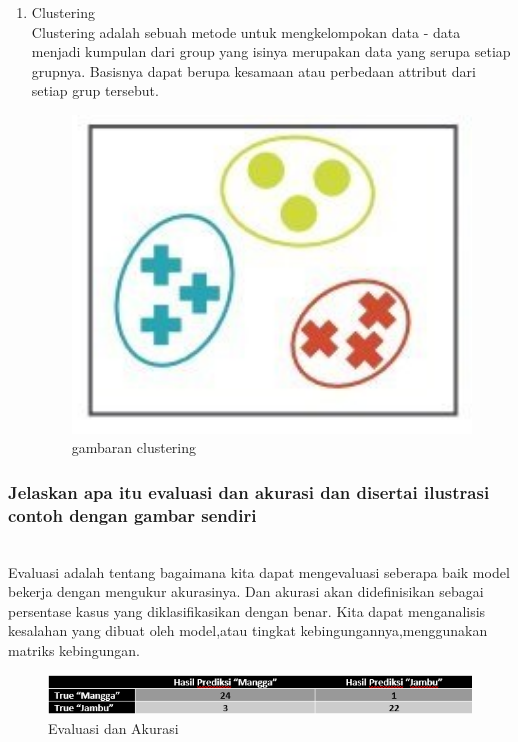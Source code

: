 \begin{enumerate}
\item Clustering 
\hfill\\
Clustering adalah sebuah metode untuk mengkelompokan data - data menjadi kumpulan dari group yang isinya merupakan data yang serupa setiap grupnya. Basisnya dapat berupa kesamaan atau perbedaan attribut dari setiap grup tersebut.
\begin{figure}[H]
    \includegraphics[width=12cm]{figures/1174087/2/cl.png}
    \centering
    \caption{gambaran clustering}
\end{figure}
\end{enumerate}

\subsubsection{Jelaskan apa itu evaluasi dan akurasi dan disertai ilustrasi contoh dengan gambar sendiri}
\hfill\\
Evaluasi adalah tentang bagaimana kita dapat mengevaluasi seberapa baik model bekerja dengan mengukur akurasinya. Dan akurasi akan dideﬁnisikan sebagai persentase kasus yang diklasiﬁkasikan dengan benar. Kita dapat menganalisis kesalahan yang dibuat oleh model,atau tingkat kebingungannya,menggunakan matriks kebingungan. 
\begin{figure}[H]
    \includegraphics[width=12cm]{figures/1174087/2/ea.png}
    \centering
    \caption{Evaluasi dan Akurasi}
\end{figure}

